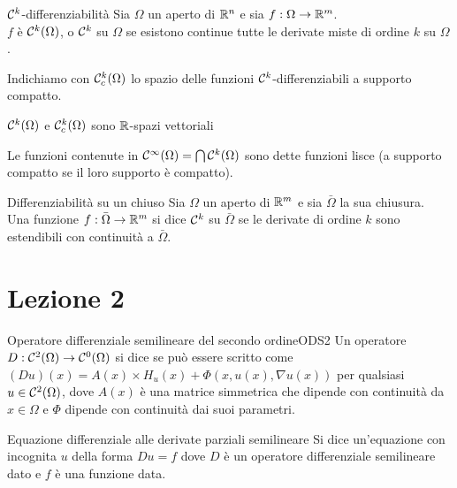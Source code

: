 \documentclass{article}
\begin{document}
\begin{definition}{$\mathcal{C}^k$-differenziabilità}{}
    Sia $\Omega$ un aperto di $\mathbb{R}^n$ e sia $f:\Omega\to\mathbb{R}^m$.\\
    $f$ è $\mathcal{C}^k(\Omega)$, o $\mathcal{C}^k$ su $\Omega$ se esistono continue tutte le derivate miste di ordine $k$ su $\Omega$.
\end{definition}

\begin{notation}
    Indichiamo con $\mathcal{C}_c^k(\Omega)$ lo spazio delle funzioni $\mathcal{C}^k$-differenziabili a supporto compatto.
\end{notation}

\begin{remark}{}{}
    $\mathcal{C}^k(\Omega)$ e $\mathcal{C}_c^k(\Omega)$ sono $\mathbb{R}$-spazi vettoriali
\end{remark}

\begin{definition}{}{}
    Le funzioni contenute in $\mathcal{C}^\infty(\Omega) = \bigcap \mathcal{C}^k(\Omega)$ sono dette funzioni lisce (a supporto compatto se il loro supporto è compatto). 
\end{definition}

\begin{definition}{Differenziabilità su un chiuso}{}
    Sia $\Omega$ un aperto di $\mathbb{R}^m$ e sia $\bar{\Omega}$ la sua chiusura.\\
    Una funzione $f:\bar{\Omega}\to\mathbb{R}^m$ si dice $\mathcal{C}^k$ su $\bar{\Omega}$ se le derivate di ordine $k$ sono estendibili con continuità a $\bar{\Omega}$.
\end{definition}

\section{Lezione 2}

\begin{definition}{Operatore differenziale semilineare del secondo ordine}{ODS2}
    Un operatore $D:\mathcal{C}^2(\Omega) \to \mathcal{C}^0(\Omega)$ si dice  se può essere scritto come $(Du)(x) = A(x)\times H_u(x) + \Phi(x,u(x), \nabla u(x))$ per qualsiasi $u \in \mathcal{C}^2(\Omega)$, dove $A(x)$ è una matrice simmetrica che dipende con continuità da $x\in\Omega$ e $\Phi$ dipende con continuità dai suoi parametri.
\end{definition}

\begin{definition}{Equazione differenziale alle derivate parziali semilineare}{}
    Si dice  un'equazione con incognita $u$ della forma $Du = f$ dove $D$ è un operatore differenziale semilineare dato e $f$ è una funzione data.
\end{definition}
\end{document}
